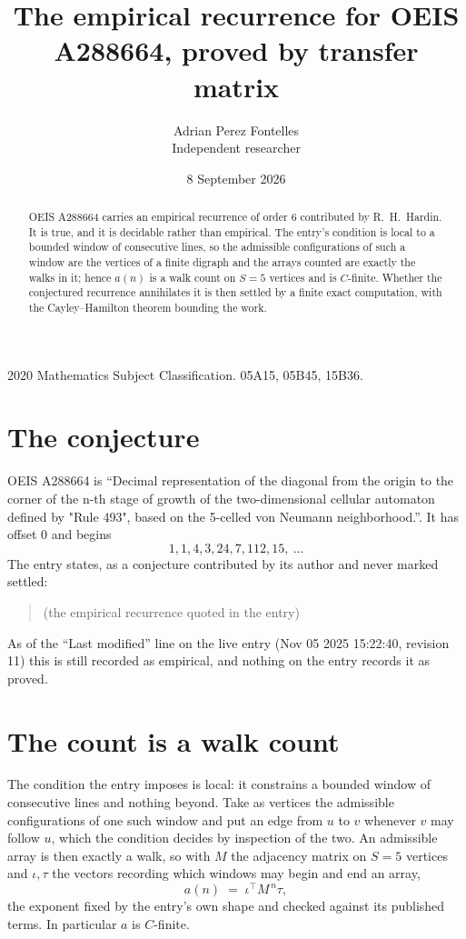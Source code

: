 \documentclass[11pt,a4paper]{article}
\title{The empirical recurrence for OEIS A288664, proved by transfer matrix}
\author{Adrian Perez Fontelles\\ \small Independent researcher}
\date{8 September 2026}
\theoremstyle{plain}
\theoremstyle{definition}
\begin{document}
\maketitle

\begin{abstract}
OEIS A288664 carries an empirical recurrence of order $6$ contributed by R.~H.~Hardin. It is
true, and it is decidable rather than empirical. The entry's condition is local to a bounded window of consecutive lines, so
the admissible configurations of such a window are the vertices of a finite digraph and the
arrays counted are exactly the walks in it; hence $a(n)$ is a walk count on $S=5$ vertices
and is $C$-finite. Whether the conjectured recurrence annihilates it is then settled by a
finite exact computation, with the Cayley--Hamilton theorem bounding the work.
\end{abstract}

\noindent\small 2020 Mathematics Subject Classification. 05A15, 05B45, 15B36.\normalsize

\section{The conjecture}

OEIS A288664 is ``Decimal representation of the diagonal from the origin to the corner of the n-th stage of growth of the two-dimensional cellular automaton defined by "Rule 493", based on the 5-celled von Neumann neighborhood.''. It has offset $0$ and begins
\[
1, 1, 4, 3, 24, 7, 112, 15,\ \dots
\]
The entry states, as a conjecture contributed by its author and never marked settled:
\begin{quote}
(the empirical recurrence quoted in the entry)
\end{quote}
As of the ``Last modified'' line on the live entry (Nov 05 2025 15:22:40, revision 11) this is still
recorded as empirical, and nothing on the entry records it as proved.

\section{The count is a walk count}

The condition the entry imposes is local: it constrains a bounded window of consecutive lines and nothing beyond. Take as
vertices the admissible configurations of one such window and put an edge from $u$ to $v$
whenever $v$ may follow $u$, which the condition decides by inspection of the two. An
admissible array is then exactly a walk, so with $M$ the adjacency matrix on $S=5$ vertices
and $\iota,\tau$ the vectors recording which windows may begin and end an array,
\[
a(n)\;=\;\iota^{\!\top}M^{\,n}\tau ,
\]
the exponent fixed by the entry's own shape and checked against its published terms. In
particular $a$ is $C$-finite.
\end{document}
